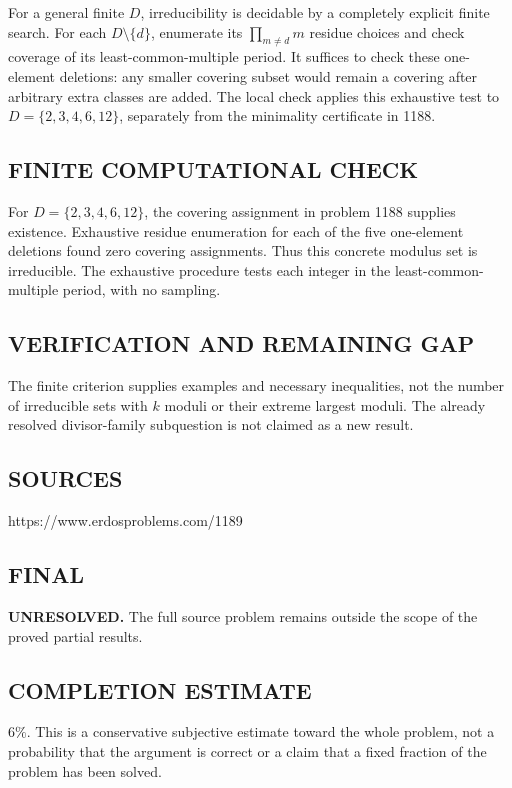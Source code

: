 For a general finite $D$, irreducibility is decidable by a completely explicit
finite search. For each $D\setminus\{d\}$, enumerate its $\prod_{m\ne d}m$
residue choices and check coverage of its least-common-multiple period.
It suffices to check these one-element deletions: any smaller covering subset
would remain a covering after arbitrary extra classes are added.
The local check applies this exhaustive test to $D=\{2,3,4,6,12\}$, separately
from the minimality certificate in 1188.

\subsection*{FINITE COMPUTATIONAL CHECK}
For $D=\{2,3,4,6,12\}$, the covering assignment in problem 1188 supplies existence. Exhaustive residue enumeration for each of the five one-element deletions found zero covering assignments. Thus this concrete modulus set is irreducible. The exhaustive procedure tests each integer in the least-common-multiple period, with no sampling.

\subsection*{VERIFICATION AND REMAINING GAP}
The finite criterion supplies examples and necessary inequalities, not the
number of irreducible sets with $k$ moduli or their extreme largest moduli.
The already resolved divisor-family subquestion is not claimed as a new result.

\subsection*{SOURCES}
https://www.erdosproblems.com/1189

\subsection*{FINAL}
\textbf{UNRESOLVED.} The full source problem remains outside the scope of the proved partial results.

\subsection*{COMPLETION ESTIMATE}
$6\%$. This is a conservative subjective estimate toward the whole problem, not a probability that the argument is correct or a claim that a fixed fraction of the problem has been solved.
